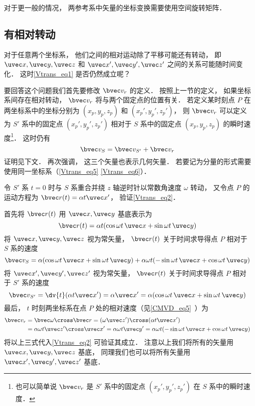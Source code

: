 对于更一般的情况， 两参考系中矢量的坐标变换需要使用空间旋转矩阵．

\subsection{有相对转动}
对于任意两个坐标系， 他们之间的相对运动除了平移可能还有转动， 即 $\uvec x, \uvec y, \uvec z$ 和 $\uvec x', \uvec y', \uvec z'$ 之间的关系可能随时间变化． 这时\autoref{Vtrans_eq1} 是否仍然成立呢？

要回答这个问题我们首先要修改 $\bvec v_r$ 的定义． 按照上一节的定义， 如果坐标系间存在相对转动， $\bvec v_r$ 将与两个固定点的位置有关． 若定义某时刻点 $P$ 在两坐标系中的坐标分别为 $(x_p, y_p, z_p)$ 和 $(x_p', y_p', z_p')$， 则 $\bvec v_r$ 可以定义为 $S'$ 系中的固定点 $(x_p', y_p', z_p')$ 相对于 $S$ 系中的固定点 $(x_p, y_p, z_p)$ 的瞬时速度\footnote{也可以简单说 $\bvec v_r$ 是 $S'$ 系中的固定点 $(x_p', y_p', z_p')$ 在 $S$ 系中的瞬时速度．}． 这时仍有
\begin{equation}\label{Vtrans_eq2}
\bvec v_{S} = \bvec v_{S'} + \bvec v_r
\end{equation}
证明见下文． 再次强调， 这三个矢量也表示几何矢量． 若要记为分量的形式需要使用同一坐标系（\autoref{Vtrans_eq5} \autoref{Vtrans_eq6}）．

\begin{example}{}\label{Vtrans_ex1}
令 $S'$ 系 $t = 0$ 时与 $S$ 系重合并绕 $z$ 轴逆时针以常数角速度 $\omega$ 转动， 又令点 $P$ 的运动方程为 $\bvec r(t) = \alpha t \uvec x'$， 验证\autoref{Vtrans_eq2}．

首先将 $\bvec r(t)$ 用 $\uvec x, \uvec y$ 基底表示为
\begin{equation}
\bvec r(t) = \alpha t (\cos\omega t\, \uvec x + \sin\omega t\, \uvec y)
\end{equation}
将 $\uvec x, \uvec y, \uvec z$ 视为常矢量， $\bvec r(t)$ 关于时间求导得点 $P$ 相对于 $S$ 系的速度
\begin{equation}
\bvec v_S = \alpha (\cos\omega t \,\uvec x + \sin\omega t \,\uvec y)
+ \alpha\omega t (-\sin\omega t \,\uvec x + \cos\omega t \,\uvec y)
\end{equation}
将 $\uvec x', \uvec y', \uvec z'$ 视为常矢量， $\bvec r(t)$ 关于时间求导得点 $P$ 相对于 $S'$ 系的速度
\begin{equation}
\bvec v_{S'} = \dv{t} (\alpha t \uvec x') = \alpha \uvec x' = \alpha (\cos\omega t\, \uvec x + \sin\omega t \,\uvec y)
\end{equation}
最后， $t$ 时刻两坐标系在点 $P$ 处的相对速度（见\autoref{CMVD_eq5}~）为
\begin{equation}\label{Vtrans_eq3}
\begin{aligned}
\bvec v_r &= \bvec\omega \cross \bvec r = (\omega \uvec z') \cross (\alpha t \uvec x') \\
&= \alpha\omega t \uvec z'\cross\uvec x' = \alpha\omega t \uvec y' = \alpha\omega t(-\sin \omega t \,\uvec x + \cos\omega t \,\uvec y)
\end{aligned}
\end{equation}
将以上三式代入\autoref{Vtrans_eq2} 可验证其成立． 注意以上我们将所有的矢量用 $\uvec x, \uvec y, \uvec z$ 基底， 同理我们也可以将所有矢量用 $\uvec x', \uvec y', \uvec z'$ 基底．
\end{example}

